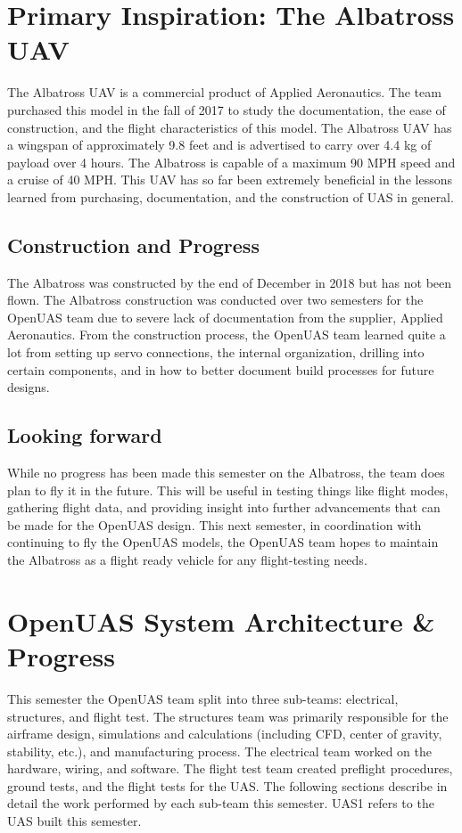 \documentclass{article}
\begin{document}
\section{Primary Inspiration: The Albatross UAV}
\noindent The Albatross UAV is a commercial product of Applied Aeronautics. The team purchased this model in the fall of 2017 to study the documentation, the ease of construction, and the flight characteristics of this model. The Albatross UAV has a wingspan of approximately 9.8 feet and is advertised to carry over 4.4 kg of payload over 4 hours. The Albatross is capable of a maximum 90 MPH speed and a cruise of 40 MPH. This UAV has so far been extremely beneficial in the lessons learned from purchasing, documentation, and the construction of UAS in general. 

\subsection{Construction and Progress}
The Albatross was constructed by the end of December in 2018 but has not been flown. The Albatross construction was conducted over two semesters for the OpenUAS team due to severe lack of documentation from the supplier, Applied Aeronautics. From the construction process, the OpenUAS team learned quite a lot from setting up servo connections, the internal organization, drilling into certain components, and in how to better document build processes for future designs. 


\subsection{Looking forward}

While no progress has been made this semester on the Albatross, the team does plan to fly it in the future. This will be useful in testing things like flight modes, gathering flight data, and providing insight into further advancements that can be made for the OpenUAS design. This next semester, in coordination with continuing to fly the OpenUAS models, the OpenUAS team hopes to maintain the Albatross as a flight ready vehicle for any flight-testing needs. 

\section{OpenUAS System Architecture \& Progress}
This semester the OpenUAS team split into three sub-teams: electrical, structures, and flight test. The structures team was primarily responsible for the airframe design, simulations and calculations (including CFD, center of gravity, stability, etc.), and manufacturing process. The electrical team worked on the hardware, wiring, and software. The flight test team created preflight procedures, ground tests, and the flight tests for the UAS. The following sections describe in detail the work performed by each sub-team this semester. UAS1 refers to the UAS built this semester.  
\end{document}
